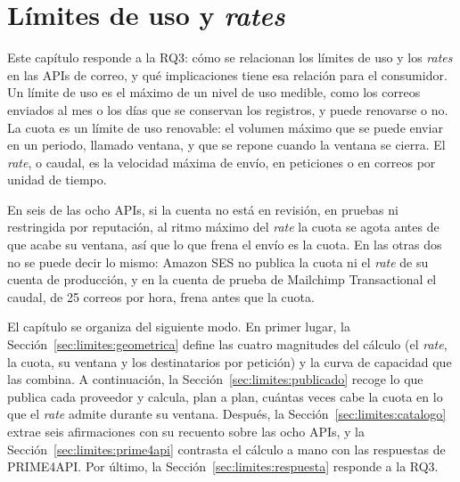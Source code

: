 \chapter{Límites de uso y \textit{rates}}
\label{cap:limites}

Este capítulo responde a la RQ3: cómo se relacionan los límites de uso y los \textit{rates} en las APIs de correo, y qué implicaciones tiene esa relación para el consumidor.
Un límite de uso es el máximo de un nivel de uso medible, como los correos enviados al mes o los días que se conservan los registros, y puede renovarse o no.
La cuota es un límite de uso renovable: el volumen máximo que se puede enviar en un periodo, llamado ventana, y que se repone cuando la ventana se cierra.
El \textit{rate}, o caudal, es la velocidad máxima de envío, en peticiones o en correos por unidad de tiempo.

En seis de las ocho APIs, si la cuenta no está en revisión, en pruebas ni restringida por reputación, al ritmo máximo del \textit{rate} la cuota se agota antes de que acabe su ventana, así que lo que frena el envío es la cuota.
En las otras dos no se puede decir lo mismo: Amazon SES no publica la cuota ni el \textit{rate} de su cuenta de producción, y en la cuenta de prueba de Mailchimp Transactional el caudal, de 25 correos por hora, frena antes que la cuota.

El capítulo se organiza del siguiente modo.
En primer lugar, la Sección~\ref{sec:limites:geometrica} define las cuatro magnitudes del cálculo (el \textit{rate}, la cuota, su ventana y los destinatarios por petición) y la curva de capacidad que las combina.
A continuación, la Sección~\ref{sec:limites:publicado} recoge lo que publica cada proveedor y calcula, plan a plan, cuántas veces cabe la cuota en lo que el \textit{rate} admite durante su ventana.
Después, la Sección~\ref{sec:limites:catalogo} extrae seis afirmaciones con su recuento sobre las ocho APIs, y la Sección~\ref{sec:limites:prime4api} contrasta el cálculo a mano con las respuestas de PRIME4API.
Por último, la Sección~\ref{sec:limites:respuesta} responde a la RQ3.






